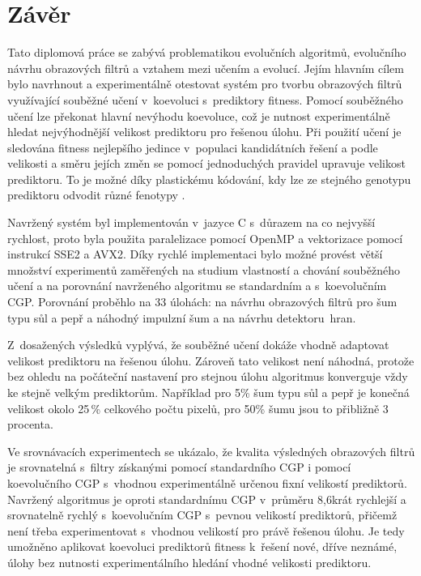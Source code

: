 \chapter{Závěr}
\label{chConclusions}
\enlargethispage{4\baselineskip} %

Tato diplomová práce se zabývá problematikou evolučních algoritmů, evolučního návrhu obrazových filtrů a vztahem mezi učením a evolucí. Jejím hlavním cílem bylo navrhnout a experimentálně otestovat systém pro tvorbu obrazových filtrů využívající souběžné učení v~koevoluci s~prediktory fitness. Pomocí souběžného učení lze překonat hlavní nevýhodu koevoluce, což je nutnost experimentálně hledat nejvýhodnější velikost prediktoru pro řešenou úlohu. Při použití učení je sledována fitness nejlepšího jedince v~populaci kandidátních řešení a podle velikosti a směru jejích změn se pomocí jednoduchých pravidel upravuje velikost prediktoru. To je možné díky plastickému kódování, kdy lze ze stejného genotypu prediktoru odvodit různé fenotypy .

Navržený systém byl implementován v~jazyce C s~důrazem na co nejvyšší rychlost, proto byla použita paralelizace pomocí OpenMP a vektorizace pomocí instrukcí SSE2 a AVX2. Díky rychlé implementaci bylo možné provést větší množství experimentů zaměřených na studium vlastností a chování souběžného učení a na porovnání navrženého algoritmu se standardním a s~koevolučním CGP. Porovnání proběhlo na 33 úlohách: na návrhu obrazových filtrů pro šum typu sůl a pepř a náhodný impulzní šum a na návrhu detektoru~hran.

Z~dosažených výsledků vyplývá, že souběžné učení dokáže vhodně adaptovat velikost prediktoru na řešenou úlohu. Zároveň tato velikost není náhodná, protože bez ohledu na počáteční nastavení pro stejnou úlohu algoritmus konverguje vždy ke stejně velkým prediktorům. Například pro 5\% šum typu sůl a pepř je konečná velikost okolo 25\,\% celkového počtu pixelů, pro 50\% šumu jsou to přibližně 3 procenta.

Ve srovnávacích experimentech se ukázalo, že kvalita výsledných obrazových filtrů je srovnatelná s~filtry získanými pomocí standardního CGP i pomocí koevolučního CGP s~vhodnou experimentálně určenou fixní velikostí prediktorů. Navržený algoritmus je oproti standardnímu CGP v~průměru 8,6krát rychlejší a srovnatelně rychlý s~koevolučním CGP s~pevnou velikostí prediktorů, přičemž není třeba experimentovat s~vhodnou velikostí pro právě řešenou úlohu. Je tedy umožněno aplikovat koevoluci prediktorů fitness k~řešení nové, dříve neznámé, úlohy bez nutnosti experimentálního hledání vhodné velikosti prediktoru.


